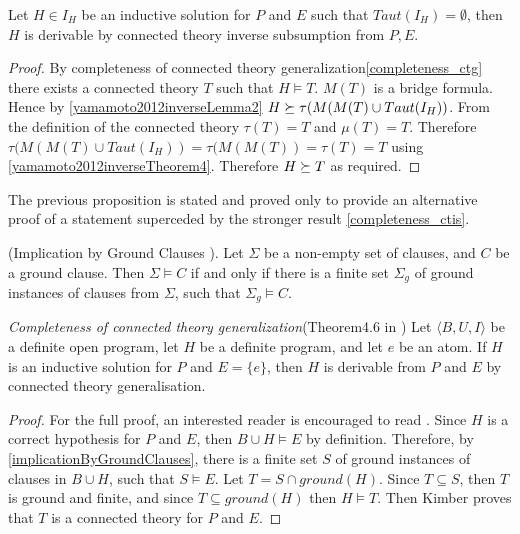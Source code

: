 \begin{proposition}
Let $H \in I_H$ be an inductive solution for $P$ and $E$ such that $Taut(I_H)=\emptyset$, then $H$ is derivable by connected theory inverse subsumption from $P, E$.
\end{proposition}
\begin{proof}
By completeness of connected theory generalization\ref{completeness_ctg} there exists a connected theory $T$ such that $H \models T$. $M(T)$ is a bridge formula.
Hence by \ref{yamamoto2012inverseLemma2}
$H \succeq \tau(M(M(T) \cup Taut(I_H))$. From the definition of the connected theory $\tau(T)=T$ and $\mu (T)=T$.
Therefore $\tau(M(M(T) \cup Taut(I_H))=\tau(M(M(T))=\tau(T)=T$ using
\ref{yamamoto2012inverseTheorem4}. Therefore $H \succeq T$ as required.
\end{proof}
\begin{remark}
The previous proposition is stated and proved only to provide an alternative proof of a statement superceded by the stronger result \ref{completeness_ctis}.
\end{remark}

\begin{thm}\label{implicationByGroundClauses}
(Implication by Ground Clauses \cite{nienhuys1997foundations}). Let $\Sigma$ be a non-empty set of clauses,
and $C$ be a ground clause. Then $\Sigma \models C$ if and only if there is a finite set $\Sigma_g$ of ground
instances of clauses from $\Sigma$, such that $\Sigma_g \models C$.
\end{thm}

\begin{thm}\label{completeness_ctg}
\emph{Completeness of connected theory generalization}(Theorem4.6 in \cite{kimber2012learning})
Let $\langle B, U, I \rangle$ be a definite open program,
let $H$ be a definite program, and let $e$ be an atom.
If $H$ is an inductive solution for $P$ and
$E = \{e\}$, then $H$ is derivable from $P$ and $E$ by connected theory generalisation.
\end{thm}
\begin{proof}\cite{kimber2012learning}
For the full proof, an interested reader is encouraged to read \cite{kimber2012learning}.
Since $H$ is a correct hypothesis for $P$ and $E$,
then $B \cup H \models E$ by definition.
Therefore, by \ref{implicationByGroundClauses}, there is a finite set $S$ of ground instances of clauses in $B \cup H$,
such that $S \models E$. Let $T = S \cap ground(H)$.
Since $T \subseteq S$, then $T$ is ground and finite, and
since $T \subseteq ground(H)$ then $H \models T$. 
Then Kimber proves that $T$ is a connected theory for $P$ and $E$.
\end{proof}

